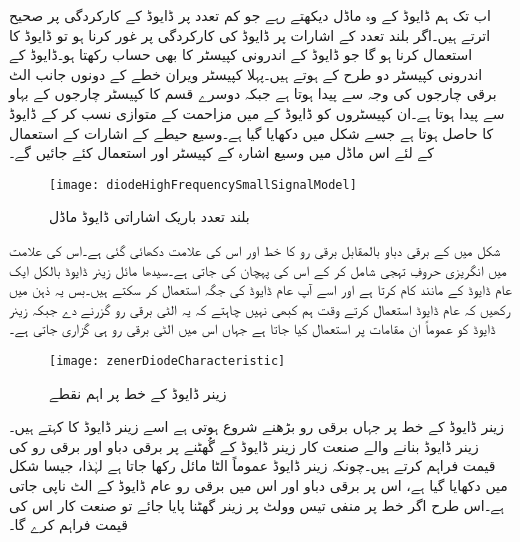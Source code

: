 	اب تک ہم ڈایوڈ کے وہ ماڈل دیکھتے رہے جو کم تعدد پر ڈایوڈ کے کارکردگی پر صحیح اترتے ہیں۔اگر بلند تعدد کے اشارات پر ڈایوڈ کی کارکردگی پر غور کرنا ہو تو ڈایوڈ کا  استعمال کرنا ہو گا جو ڈایوڈ کے اندرونی کپیسٹر کا بھی حساب رکھتا ہو۔ڈایوڈ کے اندرونی کپیسٹر دو طرح کے ہوتے ہیں۔پہلا کپیسٹر  ویران خطے کے دونوں جانب الٹ برقی چارجوں کی وجہ سے پیدا ہوتا ہے جبکہ دوسرے قسم کا کپیسٹر   چارجوں کے بہاو سے پیدا ہوتا ہے۔ان کپیسٹروں کو ڈایوڈ کے  میں مزاحمت  کے متوازی نسب کر کے ڈایوڈ کا 
  حاصل ہوتا ہے جسے شکل  میں دکھایا گیا ہے۔وسیع حیطے کے اشارات کے استعمال کے لئے اس ماڈل میں وسیع اشارہ کے کپیسٹر  اور   استعمال کئے جائیں گے۔
\begin{figure}
\centering
\texttt{[image: diodeHighFrequencySmallSignalModel]}
\caption{بلند تعدد باریک اشاراتی ڈایوڈ ماڈل}
\label{شکل_بلند_تعدد_ڈایوڈ_باریک_اشاراتی_ماڈل}
\end{figure}
شکل   میں  کے برقی دباو بالمقابل برقی رو  کا خط اور اس کی علامت دکھائی گئی ہے۔اس کی علامت میں انگریزی حروفِ تہجی   شامل کر کے اس کی پہچان کی جاتی ہے۔سیدھا مائل زینر ڈایوڈ بالکل ایک عام ڈایوڈ کے مانند کام کرتا ہے اور اسے آپ عام ڈایوڈ کی جگہ استعمال کر سکتے ہیں۔بس یہ ذہن میں رکھیں کہ عام ڈایوڈ استعمال کرتے وقت ہم کبھی نہیں چاہتے کہ یہ الٹی برقی رو گزرنے دے جبکہ زینر ڈایوڈ کو عموماً ان مقامات پر استعمال کیا جاتا ہے جہاں اس میں الٹی برقی رو ہی گزاری جاتی ہے۔
\begin{figure}
\centering
\texttt{[image: zenerDiodeCharacteristic]}
\caption{زینر ڈایوڈ کے خط پر اہم نقطے}
\label{شکل_زینر_ڈایوڈ_کا_خط}
\end{figure}
زینر ڈایوڈ کے خط پر جہاں برقی رو بڑھنے شروع ہوتی ہے اسے زینر ڈایوڈ کا    کہتے ہیں۔ زینر ڈایوڈ  بنانے والے صنعت کار زینر ڈایوڈ کے گُھٹنے پر برقی دباو  اور برقی رو  کی قیمت فراہم کرتے ہیں۔چونکہ زینر ڈایوڈ عموماً الٹا مائل رکھا جاتا ہے لہٰذا، جیسا شکل   میں دکھایا گیا ہے، اس پر برقی دباو اور اس میں برقی رو عام ڈایوڈ کے الٹ ناپی جاتی ہے۔اس طرح اگر خط پر منفی تیس وولٹ  پر زینر گھٹنا پایا جائے تو صنعت کار اس کی قیمت  فراہم کرے گا۔

